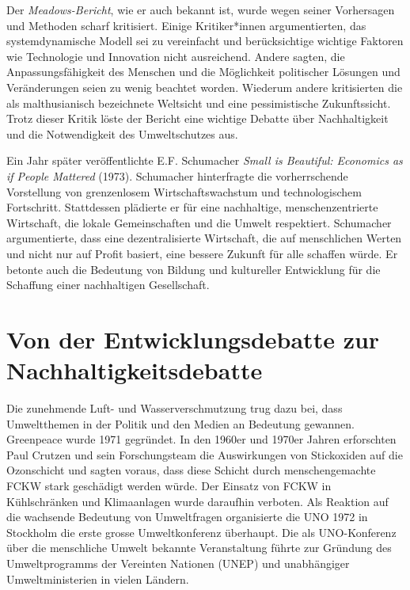 \documentclass[
  nswissgerman,
  a4paper,
  DIV=11,
  numbers=noendperiod,
  oneside,
  openany]{scrreprt}
\begin{document}
Der \emph{Meadows-Bericht}, wie er auch bekannt ist, wurde wegen seiner
Vorhersagen und Methoden scharf kritisiert. Einige Kritiker*innen
argumentierten, das systemdynamische Modell sei zu vereinfacht und
berücksichtige wichtige Faktoren wie Technologie und Innovation nicht
ausreichend. Andere sagten, die Anpassungsfähigkeit des Menschen und die
Möglichkeit politischer Lösungen und Veränderungen seien zu wenig
beachtet worden. Wiederum andere kritisierten die als malthusianisch
bezeichnete Weltsicht und eine pessimistische Zukunftssicht. Trotz
dieser Kritik löste der Bericht eine wichtige Debatte über
Nachhaltigkeit und die Notwendigkeit des Umweltschutzes aus.

Ein Jahr später veröffentlichte E.F. Schumacher \emph{Small is
Beautiful: Economics as if People Mattered} (1973). Schumacher
hinterfragte die vorherrschende Vorstellung von grenzenlosem
Wirtschaftswachstum und technologischem Fortschritt. Stattdessen
plädierte er für eine nachhaltige, menschenzentrierte Wirtschaft, die
lokale Gemeinschaften und die Umwelt respektiert. Schumacher
argumentierte, dass eine dezentralisierte Wirtschaft, die auf
menschlichen Werten und nicht nur auf Profit basiert, eine bessere
Zukunft für alle schaffen würde. Er betonte auch die Bedeutung von
Bildung und kultureller Entwicklung für die Schaffung einer nachhaltigen
Gesellschaft.

\section{Von der Entwicklungsdebatte zur
Nachhaltigkeitsdebatte}\label{von-der-entwicklungsdebatte-zur-nachhaltigkeitsdebatte}

Die zunehmende Luft- und Wasserverschmutzung trug dazu bei, dass
Umweltthemen in der Politik und den Medien an Bedeutung gewannen.
Greenpeace wurde 1971 gegründet. In den 1960er und 1970er Jahren
erforschten Paul Crutzen und sein Forschungsteam die Auswirkungen von
Stickoxiden auf die Ozonschicht und sagten voraus, dass diese Schicht
durch menschengemachte FCKW stark geschädigt werden würde. Der Einsatz
von FCKW in Kühlschränken und Klimaanlagen wurde daraufhin verboten. Als
Reaktion auf die wachsende Bedeutung von Umweltfragen organisierte die
UNO 1972 in Stockholm die erste grosse Umweltkonferenz überhaupt. Die
als UNO-Konferenz über die menschliche Umwelt bekannte Veranstaltung
führte zur Gründung des Umweltprogramms der Vereinten Nationen (UNEP)
und unabhängiger Umweltministerien in vielen Ländern.
\end{document}
